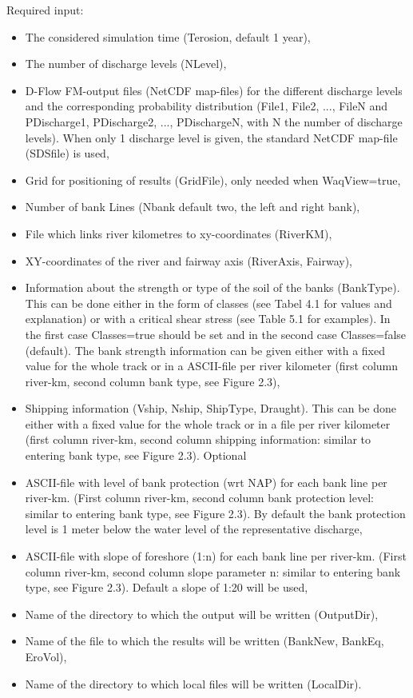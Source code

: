 Required input:

\begin{itemize}
\item The considered simulation time (Terosion, default 1 year),
\item The number of discharge levels (NLevel),
\item D-Flow FM-output files (NetCDF map-files) for the different discharge levels and the corresponding probability distribution (File1, File2, ..., FileN and PDischarge1, PDischarge2, ..., PDischargeN, with N the number of discharge levels).
When only 1 discharge level is given, the standard NetCDF map-file (SDSfile) is used,
\item Grid for positioning of results (GridFile), only needed when WaqView=true,
\item Number of bank Lines (Nbank default two, the left and right bank),
\item File which links river kilometres to xy-coordinates (RiverKM),
\item XY-coordinates of the river and fairway axis (RiverAxis, Fairway),
\item Information about the strength or type of the soil of the banks (BankType).
This can be done either in the form of classes (see Tabel 4.1 for values and explanation) or with a critical shear stress (see Table 5.1 for examples).
In the first case Classes=true should be set and in the second case Classes=false (default).
The bank strength information can be given either with a fixed value for the whole track or in a ASCII-file per river kilometer (first column river-km, second column bank type, see Figure 2.3),
\item Shipping information (Vship, Nship, ShipType, Draught).
This can be done either with a fixed value for the whole track or in a file per river kilometer (first column river-km, second column shipping information: similar to entering bank type, see Figure 2.3).
Optional
\item ASCII-file with level of bank protection (wrt NAP) for each bank line per river-km.
(First column river-km, second column bank protection level: similar to entering bank type, see Figure 2.3).
By default the bank protection level is 1 meter below the water level of the representative discharge,
\item ASCII-file with slope of foreshore (1:n) for each bank line per river-km.
(First column river-km, second column slope parameter n: similar to entering bank type, see Figure 2.3).
Default a slope of 1:20 will be used,
\item Name of the directory to which the output will be written (OutputDir),
\item Name of the file to which the results will be written (BankNew, BankEq, EroVol),
\item Name of the directory to which local files will be written (LocalDir).
\end{itemize}

